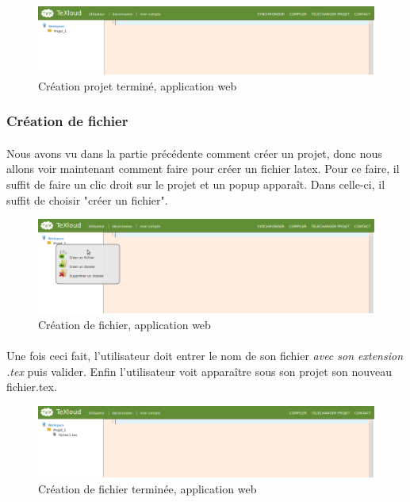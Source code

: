 \documentclass[a4paper,12pt]{article}
\begin{document}
\begin{figure}[!ht]
\begin{center}
  \includegraphics[width=1\textwidth]{./images/screenshot/Suite2_Creation_Projet.png}
\end{center}
  \caption{Création projet terminé, application web}
  \label{suite2CreationProjet}
\end{figure}


\subsubsection{Création de fichier}
\paragraph*{}
Nous avons vu dans la partie précédente comment créer un projet, donc nous allons voir maintenant comment faire pour créer un fichier latex. Pour ce faire, il suffit de faire un clic droit sur le projet et un popup apparaît. Dans celle-ci, il suffit de choisir "créer un fichier". 
\begin{figure}[!ht]
\begin{center}
  \includegraphics[width=1\textwidth]{./images/screenshot/MenuTextuel.png}
\end{center}
  \caption{Création de fichier, application web}
  \label{creationFichier}
\end{figure}

\clearpage

\paragraph*{}
Une fois ceci fait, l'utilisateur doit entrer le nom de son fichier \emph{avec son extension .tex} puis valider. Enfin l'utilisateur voit apparaître sous son projet son nouveau fichier.tex.
\begin{figure}[!ht]
\begin{center}
  \includegraphics[width=1\textwidth]{./images/screenshot/Suite_Creation_Fichier.png}
\end{center}
  \caption{Création de fichier terminée, application web}
  \label{creationFichierFin}
\end{figure}
\end{document}
